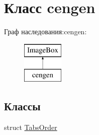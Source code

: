 \hypertarget{classcengen}{\section{Класс cengen}
\label{classcengen}
}
Граф наследования\-:cengen\-:\begin{figure}[H]
\begin{center}
\leavevmode
\includegraphics[height=2.000000cm]{classcengen}
\end{center}
\end{figure}
\subsection*{Классы}
\begin{DoxyCompactItemize}
\item 
struct \hyperlink{structcengen_1_1_tabs_order}{\-Tabs\-Order}
\end{DoxyCompactItemize}
